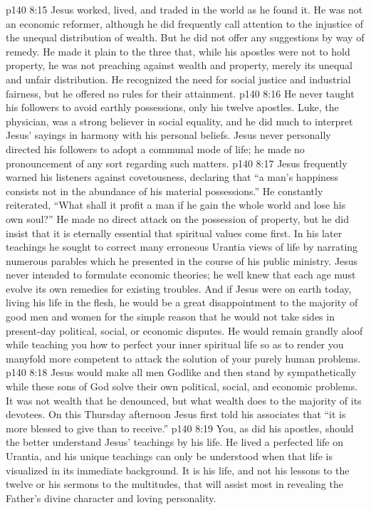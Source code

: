 \pc \vs p140 8:15 \bibnobreakspace {} Jesus worked, lived, and traded in the world as he found it. He was not an economic reformer, although he did frequently call attention to the injustice of the unequal distribution of wealth. But he did not offer any suggestions by way of remedy. He made it plain to the three that, while his apostles were not to hold property, he was not preaching against wealth and property, merely its unequal and unfair distribution. He recognized the need for social justice and industrial fairness, but he offered no rules for their attainment.\plusone
\vs p140 8:16 He never taught his followers to avoid earthly possessions, only his twelve apostles. Luke, the physician, was a strong believer in social equality, and he did much to interpret Jesus’ sayings in harmony with his personal beliefs. Jesus never personally directed his followers to adopt a communal mode of life; he made no pronouncement of any sort regarding such matters.
\vs p140 8:17 Jesus frequently warned his listeners against covetousness, declaring that \textcolor{ubdarkred}{“a man’s happiness consists not in the abundance of his material possessions.”} He constantly reiterated, \textcolor{ubdarkred}{“What shall it profit a man if he gain the whole world and lose his own soul?”} He made no direct attack on the possession of property, but he did insist that it is eternally essential that spiritual values come first. In his later teachings he sought to correct many erroneous Urantia views of life by narrating numerous parables which he presented in the course of his public ministry. Jesus never intended to formulate economic theories; he well knew that each age must evolve its own remedies for existing troubles. And if Jesus were on earth today, living his life in the flesh, he would be a great disappointment to the majority of good men and women for the simple reason that he would not take sides in present\hyp{}day political, social, or economic disputes. He would remain grandly aloof while teaching you how to perfect your inner spiritual life so as to render you manyfold more competent to attack the solution of your purely human problems.
\pc \vs p140 8:18 Jesus would make all men Godlike and then stand by sympathetically while these sons of God solve their own political, social, and economic problems. It was not wealth that he denounced, but what wealth does to the majority of its devotees. On this Thursday afternoon Jesus first told his associates that \textcolor{ubdarkred}{“it is more blessed to give than to receive.”}
\pc \vs p140 8:19 \bibnobreakspace {} You, as did his apostles, should the better understand Jesus’ teachings by his life. He lived a perfected life on Urantia, and his unique teachings can only be understood when that life is visualized in its immediate background. It is his life, and not his lessons to the twelve or his sermons to the multitudes, that will assist most in revealing the Father’s divine character and loving personality.
